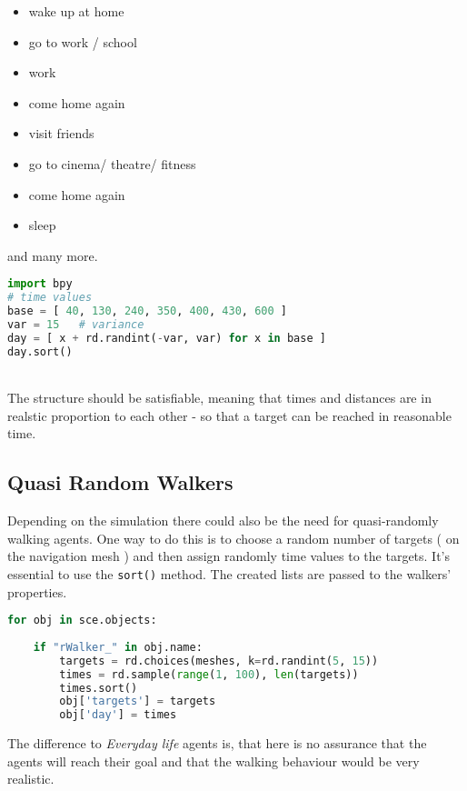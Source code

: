 \documentclass[11pt,a4paper]{article}
\begin{document}
\begin{minipage}{0.4\textwidth}
\begin{itemize}
\item wake up at home
\item go to work / school
\item work 
\item come home again
\item visit friends
\item go to cinema/ theatre/ fitness
\item come home again
\item sleep
\end{itemize}
and many more. 
\end{minipage} \hfill\begin{minipage}{0.55\textwidth}
\begin{lstlisting}[language = Python, breaklines=true,  caption={Basic time structure for normal agent's day}]
import bpy
# time values  
base = [ 40, 130, 240, 350, 400, 430, 600 ]  
var = 15   # variance
day = [ x + rd.randint(-var, var) for x in base ]
day.sort()
\end{lstlisting}
\end{minipage}\\
The structure should be satisfiable, meaning that times and distances are in realstic proportion to each other - so that a target can be reached in reasonable time.

\subsection{Quasi Random Walkers}
Depending on the simulation there could also be the need for quasi-randomly walking agents. One way to do this is to choose a random number of targets ( on the navigation mesh ) and then assign randomly time values to the targets. It's essential to use the \texttt{sort()} method. The created lists are passed to the walkers' properties.
\begin{lstlisting}[language = Python, breaklines=true, caption={randomWalkers}]
for obj in sce.objects:
                                                                            
    if "rWalker_" in obj.name: 
        targets = rd.choices(meshes, k=rd.randint(5, 15))
        times = rd.sample(range(1, 100), len(targets)) 
        times.sort()           
        obj['targets'] = targets
        obj['day'] = times 
\end{lstlisting}        
The difference to \textit{Everyday life} agents is, that here is no assurance that the agents will reach their goal and that the walking behaviour would be very realistic.
\end{document}
